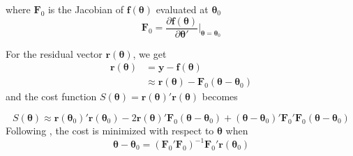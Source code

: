 where $\mathbf{F}_0$ is the Jacobian of $\mathbf{f}(\boldsymbol{\theta})$ 
evaluated at $\boldsymbol{\theta}_0$
\begin{equation}
\mathbf{F}_0 = \frac{\partial \mathbf{f}(\boldsymbol{\theta})} {\partial \boldsymbol{\theta}'} \bigg|_{\boldsymbol{\theta} = \boldsymbol{\theta}_0}
\end{equation}


For the residual vector $\mathbf{r}(\boldsymbol{\theta})$, we get
\begin{align}
\mathbf{r}(\boldsymbol{\theta}) 
&= \mathbf{y} - \mathbf{f}(\boldsymbol{\theta}) \nonumber\\
&\approx \mathbf{r}(\boldsymbol{\theta}) - \mathbf{F}_0(\boldsymbol{\theta} - \boldsymbol{\theta}_0)
\end{align}
and the cost function 
$S(\boldsymbol{\theta}) = \mathbf{r}(\boldsymbol{\theta})' \mathbf{r}(\boldsymbol{\theta})$
becomes

\begin{equation}
S(\boldsymbol{\theta}) \approx
\mathbf{r}(\boldsymbol{\theta}_0)' \mathbf{r}(\boldsymbol{\theta}_0) -
2 \mathbf{r}(\boldsymbol{\theta}) ' \mathbf{F}_0(\boldsymbol{\theta} - \boldsymbol{\theta}_0) + 
(\boldsymbol{\theta} - \boldsymbol{\theta}_0)'
\mathbf{F}_0' \mathbf{F}_0
(\boldsymbol{\theta} - \boldsymbol{\theta}_0)
\end{equation}
Following \citet[chap. 2]{Seber}, the cost is minimized with respect to $\boldsymbol{\theta}$ when
\begin{equation}
\boldsymbol{\theta} - \boldsymbol{\theta}_0 = 
(\mathbf{F}_0' \mathbf{F}_0)^{-1} \mathbf{F}_0' \mathbf{r}(\boldsymbol{\theta}_0)
\end{equation}

